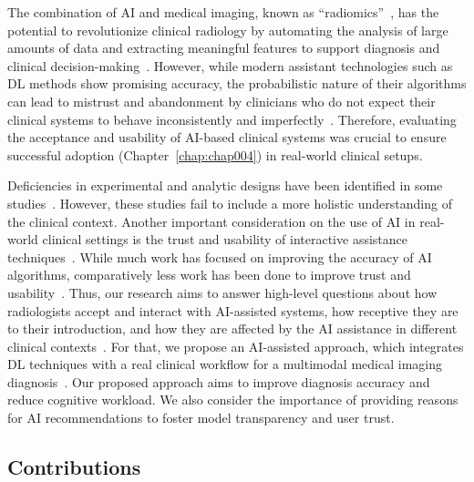 The combination of \ac{AI} and medical imaging, known as ``radiomics''~\cite{Lambin2017}, has the potential to revolutionize clinical radiology by automating the analysis of large amounts of data and extracting meaningful features to support diagnosis and clinical decision-making~\cite{Ruddle:2016:DEI:2872314.2834117, Park:2015:TOA:2737795.2656213}.
However, while modern assistant technologies such as \ac{DL} methods show promising accuracy, the probabilistic nature of their algorithms can lead to mistrust and abandonment by clinicians who do not expect their clinical systems to behave inconsistently and imperfectly~\cite{benrimoh2018aifred, hoff2015trust, Kocielnik:2019:YAI:3290605.3300641}.
Therefore, evaluating the acceptance and usability of \ac{AI}-based clinical systems was crucial to ensure successful adoption (Chapter~\ref{chap:chap004}) in real-world clinical setups.

Deficiencies in experimental and analytic designs have been identified in some studies~\cite{aerts2017data, ker2018deep, Sultanum:2018:MTP:3173574.3173996}.
However, these studies fail to include a more holistic understanding of the clinical context.
Another important consideration on the use of \ac{AI} in real-world clinical settings is the trust and usability of interactive assistance techniques~\cite{benrimoh2018aifred, Cadario2021}.
While much work has focused on improving the accuracy of \ac{AI} algorithms, comparatively less work has been done to improve trust and usability~\cite{10.1145/3008665.3008669, 10.1145/274430.274436}.
Thus, our research aims to answer high-level questions about how radiologists accept and interact with AI-assisted systems, how receptive they are to their introduction, and how they are affected by the AI assistance in different clinical contexts~\cite{CALISTO2022102285, CALISTO2021102607}.
For that, we propose an AI-assisted approach, which integrates \ac{DL} techniques with a real clinical workflow for a multimodal medical imaging diagnosis~\cite{10.1145/3399715.3399744}.
Our proposed approach aims to improve diagnosis accuracy and reduce cognitive workload.
We also consider the importance of providing reasons for \ac{AI} recommendations to foster model transparency and user trust.

\subsection{Contributions}
\label{sec:chap005001001}


